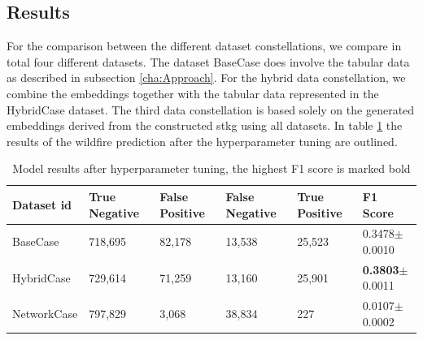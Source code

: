 \documentclass[
]{ceurart}
\begin{document}


\subsection{Results}\label{cha:Results}
For the comparison between the different dataset constellations, we compare in total four different datasets. The dataset BaseCase does involve the tabular data as described in subsection \ref{cha:Approach}. For the hybrid data constellation, we combine the embeddings together with the tabular data represented in the HybridCase dataset. The third data constellation is based solely on the generated embeddings derived from the constructed \gls*{stkg} using all datasets. In table \ref{tab:resultModeling} the results of the wildfire prediction after the hyperparameter tuning are outlined.
\begin{table}[t]
	\caption{Model results after hyperparameter tuning, the highest F1 score is marked bold}
	\label{tab:resultModeling}
    \begin{tabular}{p{}p{}p{}p{}p{}p{}}
		\toprule
		Dataset \gls*{id} & True Negative & False Positive & False Negative & True \linebreak Positive & F1 Score\\
		\midrule
		BaseCase & 718,695 & 82,178 & 13,538 & 25,523 & 0.3478$\pm$0.0010 \\
		HybridCase & 729,614 & 71,259 & 13,160 & 25,901 & \textbf{0.3803}$\pm$0.0011 \\
		NetworkCase & 797,829 & 3,068 & 38,834 & 227 & 0.0107$\pm$0.0002 \\
		\bottomrule
	\end{tabular}
\end{table}
\end{document}
